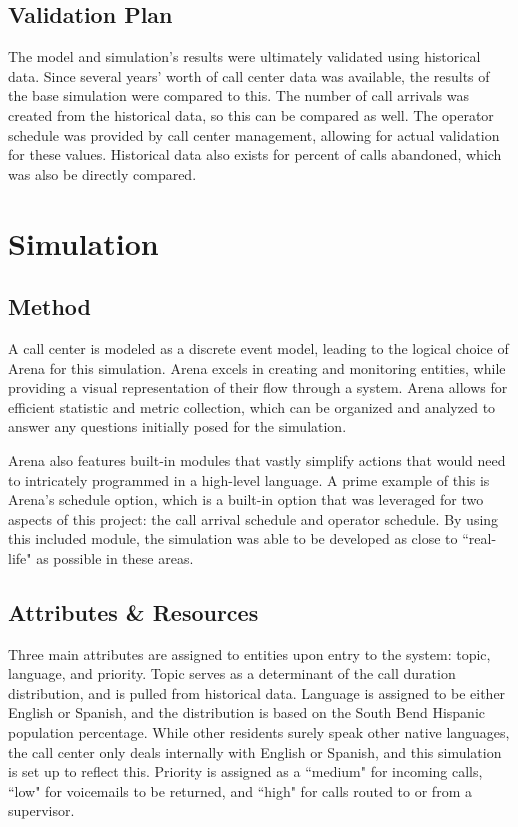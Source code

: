 \documentclass[12pt,twocolumn]{article}
\begin{document}
	
	\subsection{Validation Plan}
	
The model and simulation's results were ultimately validated using historical data.  Since several years' worth of call center data was available, the results of the base simulation were compared to this.  The number of call arrivals was created from the historical data, so this can be compared as well.  The operator schedule was provided by call center management, allowing for actual validation for these values.  Historical data also exists for percent of calls abandoned, which was also be directly compared.
	
\section{Simulation}

	\subsection{Method}
	
A call center is modeled as a discrete event model, leading to the logical choice of Arena for this simulation.  Arena excels in creating and monitoring entities, while providing a visual representation of their flow through a system.  Arena allows for efficient statistic and metric collection, which can be organized and analyzed to answer any questions initially posed for the simulation.

\par

Arena also features built-in modules that vastly simplify actions that would need to intricately programmed in a high-level language.  A prime example of this is Arena's schedule option, which is a built-in option that was leveraged for two aspects of this project:  the call arrival schedule and operator schedule.  By using this included module, the simulation was able to be developed as close to ``real-life" as possible in these areas.
	
	\subsection{Attributes \& Resources}

Three main attributes are assigned to entities upon entry to the system:  topic, language, and priority.  Topic serves as a determinant of the call duration distribution, and is pulled from historical data.  Language is assigned to be either English or Spanish, and the distribution is based on the South Bend Hispanic population percentage.  While other residents surely speak other native languages, the call center only deals internally with English or Spanish, and this simulation is set up to reflect this.  Priority is assigned as a ``medium" for incoming calls, ``low" for voicemails to be returned, and ``high" for calls routed to or from a supervisor.
\end{document}
